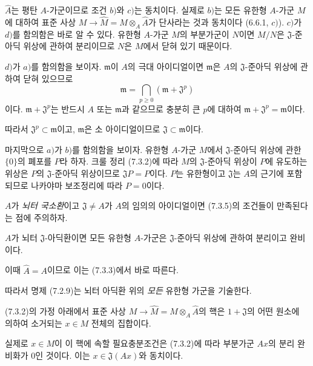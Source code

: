 $\widehat A$는 평탄 $A$-가군이므로 조건 $b)$와 $c)$는 동치이다.
실제로 $b)$는 모든 유한형 $A$-가군 $M$에 대하여 표준 사상
$M\to\widehat M=M\otimes_A\widehat A$가 단사라는 것과 동치이다
(6.6.1, $c)$). $c)$가 $d)$를 함의함은 바로 알 수 있다. 유한형
$A$-가군 $M$의 부분가군이 $N$이면 $M/N$은
$\mathfrak J$-준아딕 위상에 관하여 분리이므로 $N$은 $M$에서
닫혀 있기 때문이다.

$d)$가 $a)$를 함의함을 보이자. $\mathfrak m$이 $A$의 극대
아이디얼이면 $\mathfrak m$은 $A$의 $\mathfrak J$-준아딕 위상에
관하여 닫혀 있으므로
\[
  \mathfrak m=\bigcap_{p\geq0}(\mathfrak m+\mathfrak J^p)
\]
이다. $\mathfrak m+\mathfrak J^p$는 반드시 $A$ 또는
$\mathfrak m$과 같으므로 충분히 큰 $p$에 대하여
$\mathfrak m+\mathfrak J^p=\mathfrak m$이다.


따라서 $\mathfrak J^p\subset\mathfrak m$이고, $\mathfrak m$은
소 아이디얼이므로 $\mathfrak J\subset\mathfrak m$이다.

마지막으로 $a)$가 $b)$를 함의함을 보이자. 유한형 $A$-가군
$M$에서 $\mathfrak J$-준아딕 위상에 관한 $\{0\}$의 폐포를 $P$라
하자. 크룰 정리 (7.3.2)에 따라 $M$의
$\mathfrak J$-준아딕 위상이 $P$에 유도하는 위상은 $P$의
$\mathfrak J$-준아딕 위상이므로 $\mathfrak JP=P$이다. $P$는
유한형이고 $\mathfrak J$는 $A$의 근기에 포함되므로 나카야마
보조정리에 따라 $P=0$이다.

$A$가 \emph{뇌터 국소환}이고 $\mathfrak J\neq A$가 $A$의 임의의
아이디얼이면 (7.3.5)의 조건들이 만족된다는 점에 주의하자.

\begin{corollary}[7.3.6]
\label{0.7.3.6-ko}
$A$가 뇌터 $\mathfrak J$-아딕환이면 모든 유한형 $A$-가군은
$\mathfrak J$-준아딕 위상에 관하여 분리이고 완비이다.
\end{corollary}

이때 $\widehat A=A$이므로 이는 (7.3.3)에서 바로 따른다.

따라서 명제 (7.2.9)는 뇌터 아딕환 위의 \emph{모든} 유한형
가군을 기술한다.

\begin{corollary}[7.3.7]
\label{0.7.3.7-ko}
(7.3.2)의 가정 아래에서 표준 사상
$M\to\widehat M=M\otimes_A\widehat A$의 핵은
$1+\mathfrak J$의 어떤 원소에 의하여 소거되는 $x\in M$ 전체의
집합이다.
\end{corollary}

실제로 $x\in M$이 이 핵에 속할 필요충분조건은 (7.3.2)에 따라
부분가군 $Ax$의 분리 완비화가 $0$인 것이다. 이는
$x\in\mathfrak J(Ax)$와 동치이다.

